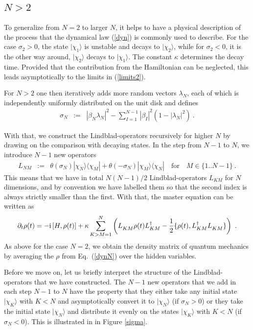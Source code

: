 \documentclass[12pt]{article}
\def\beqn{\begin{eqnarray}}
\def\eeqn{\end{eqnarray}}
\begin{document}
 \subsection{$N>2$}

To generalize from $N=2$ to larger $N$, it helps to have a physical description of the process that the dynamical law (\ref{dyn}) is commonly used to describe. For the case $\sigma_2 > 0$, the state $|\chi_1\rangle$ is unstable and decays to $|\chi_2\rangle$, while for $\sigma_2 < 0$, it is the other way around,  $|\chi_2 \rangle$ decays to $|\chi_1 \rangle$. The constant $\kappa$ determines the decay time. Provided that the contribution from the Hamiltonian can be neglected, this leads asymptotically to the limits in (\ref{limits2}). 

For $N>2$ one then iteratively adds more random vectors $\lambda_N$, each of which is independently uniformly distributed on the unit disk and defines  
\beqn
\sigma_N &:=& | \beta_N  \lambda_N |^2 - \sum_{I=1}^{N-1} |\beta_I|^2 (1 - |\lambda_N|^2 ) ~.
\eeqn


With that, we construct the Lindblad-operators recursively for higher $N$ by drawing on the comparison with decaying states. In the step from $N-1$ to $N$, we introduce $N-1$ new operators 
\beqn
L_{NM} &:=&    \theta(\sigma_N)   |\chi_N \rangle \langle \chi_M| + 
 \theta(-\sigma_N)  |\chi_M \rangle \langle \chi_N| \quad \mbox{for} \quad M \in \{1.. N-1\}~. \label{lnk}
\eeqn
This means that we have in total $N(N-1)/2$ Lindblad-operators $L_{KM}$ for $N$ dimensions, and by convention we have labelled them so that the second index is always strictly smaller than the first. With that, the master equation can be written as
\beqn
\partial_t \rho(t) = - {\rm i} \left[  H, \rho(t) \right] +  
\kappa \sum_{K>M=1}^N  \left( L^{\textcolor{white}{\dag}}_{KM} \rho(t) L_{KM}^\dag - \frac{1}{2} \{ \rho(t), L^\dag_{KM} L_{KM}^{\textcolor{white}{\dag}} \} \right)~. \label{dynN}
\eeqn
As above for the case $N=2$, we obtain the density matrix of quantum mechanics by averaging the $\rho$ from Eq.\ (\ref{dynN}) over the hidden variables.

Before we move on, let us briefly interpret the structure of the Lindblad-operators that we have constructed. The $N-1$ new operators that we add in each step $N-1$ to $N$ have the property that they either take any initial state $| \chi_K\rangle$ with $K<N$ and asymptotically convert it to $|\chi_N\rangle$ (if $\sigma_N > 0$) or they take the initial state $|\chi_N \rangle$ and distribute it evenly on the states $|\chi_K\rangle$ with $K < N$ (if $\sigma_N < 0$). This is illustrated in in Figure \ref{sigma}.
\end{document}
